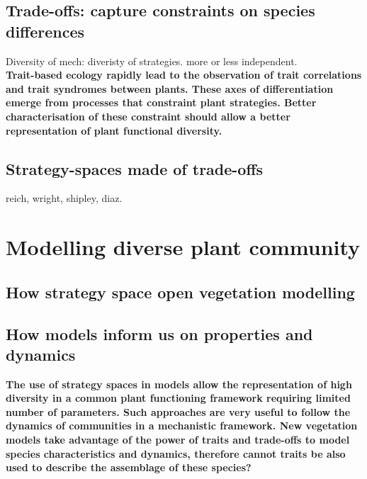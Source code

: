 \subsection{Trade-offs: capture constraints on species differences}

Diversity of mech: diveristy of strategies. more or less independent.\\

\textbf{Trait-based ecology rapidly lead to the observation of trait correlations and trait syndromes between plants. These axes of differentiation emerge from processes that constraint plant strategies. Better characterisation of these constraint should allow a better representation of plant functional diversity.}

\subsection{Strategy-spaces made of trade-offs}

reich, wright, shipley, diaz.

\textbf{ }


\section{Modelling diverse plant community}

\subsection{How strategy space open vegetation modelling}

\subsection{How models inform us on properties and dynamics}

\textbf{The use of strategy spaces in models allow the representation of high diversity in a common plant functioning framework requiring limited number of parameters. Such approaches are very useful to follow the dynamics of communities in a mechanistic framework. New vegetation models take advantage of the power of traits and trade-offs to model species characteristics and dynamics, therefore cannot traits be also used to describe the assemblage of these species? }

